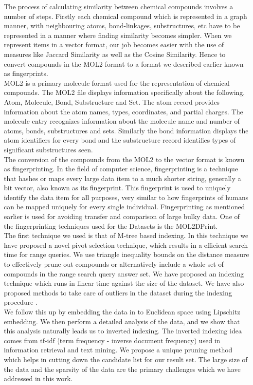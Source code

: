 The process of calculating similarity between chemical compounds involves a number of steps. Firstly each chemical compound which is represented in a graph manner, with neighbouring atoms, bond-linkages, substructures, etc have to be represented in a manner where finding similarity becomes simpler. When we represent items in a vector format, our job becomes easier with the use of measures like Jaccard Similarity as well as the Cosine Similarity. Hence to convert compounds in the MOL2 format to a format we described earlier known as fingerprints. \\

MOL2 is a primary molecule format used for the representation of chemical compounds. The MOL2 file displays information specifically about the following, Atom, Molecule, Bond, Substructure and Set. The atom record provides information about the atom names, types, coordinates, and partial charges. The molecule entry recognizes information about the molecule name and number of atoms, bonds, substructures and sets. Similarly the bond information displays the atom identifiers for every bond and the substructure record identifies types of significant substructures seen.\\

The conversion of the compounds from the MOL2 to the vector format is known as fingerprinting.  In the field of computer science, fingerprinting is a technique that hashes or maps every large data item to a much shorter string, generally a bit vector, also known as its fingerprint. This fingerprint is used to uniquely identify the data item for all purposes, very similar to how fingerprints of humans can be mapped uniquely for every single individual. Fingerprinting as mentioned earlier is used for avoiding transfer and comparison of large bulky data. One of the fingerprinting techniques used for the Datasets is the MOL2DPrint.\\

The first technique we used is that of M-tree \cite{ciaccia1997indexing} based indexing. In this technique we have proposed a novel pivot selection technique, which results in a efficient search time for range queries. We use triangle inequality bounds on the distance measure to effectively prune out compounds or alternatively include a whole set of compounds in the range search query answer set. We have proposed an indexing technique which runs in linear time against the size of the dataset. We have also proposed methods to take care of outliers in the dataset during the indexing procedure .\\

We follow this up by embedding the data in to Euclidean space using Lipschitz embedding. We then perform a detailed analysis of the data, and we show that this analysis naturally leads us to inverted indexing. The inverted indexing idea comes from tf-idf (term frequency - inverse document frequency) used in information retrieval and text mining. We propose a unique pruning method which helps in cutting down the candidate list for our result set.  The large size of the data and the sparsity of the data are the primary challenges which we have addressed in this work.\\

	